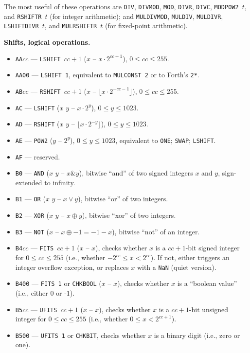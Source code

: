\documentclass[12pt,oneside]{article}
\def\makepoint#1{\medbreak\noindent{\bf #1.\ }}
\def\nxsubpoint{\refstepcounter{subsubsection}%
    \smallbreak\makepoint{\thesubsubsection}}
\def\emb#1{\textbf{#1.}}
\begin{document}
The most useful of these operations are {\tt DIV}, {\tt DIVMOD}, {\tt MOD}, {\tt DIVR}, {\tt DIVC}, {\tt MODPOW2 $t$}, and {\tt RSHIFTR $t$} (for integer arithmetic); and {\tt MULDIVMOD}, {\tt MULDIV}, {\tt MULDIVR}, {\tt LSHIFTDIVR $t$}, and {\tt MULRSHIFTR $t$} (for fixed-point arithmetic).

\nxsubpoint\emb{Shifts, logical operations}
\begin{itemize}
\item {\tt AA$cc$} --- {\tt LSHIFT $cc+1$} ($x$ -- $x\cdot2^{cc+1}$), $0\leq cc\leq255$.
\item {\tt AA00} --- {\tt LSHIFT 1}, equivalent to {\tt MULCONST 2} or to Forth's {\tt 2*}.
\item {\tt AB$cc$} --- {\tt RSHIFT $cc+1$} ($x$ -- $\lfloor x\cdot2^{-cc-1}\rfloor$), $0\leq cc\leq255$.
\item {\tt AC} --- {\tt LSHIFT} ($x$ $y$ -- $x\cdot 2^y$), $0\leq y\leq 1023$.
\item {\tt AD} --- {\tt RSHIFT} ($x$ $y$ -- $\lfloor x\cdot 2^{-y}\rfloor$), $0\leq y\leq 1023$.
\item {\tt AE} --- {\tt POW2} ($y$ -- $2^y$), $0\leq y\leq1023$, equivalent to {\tt ONE}; {\tt SWAP}; {\tt LSHIFT}.
\item {\tt AF} --- reserved.
\item {\tt B0} --- {\tt AND} ($x$ $y$ -- $x\&y$), bitwise ``and'' of two signed integers $x$ and $y$, sign-extended to infinity.
\item {\tt B1} --- {\tt OR} ($x$ $y$ -- $x\vee y$), bitwise ``or'' of two integers.
\item {\tt B2} --- {\tt XOR} ($x$ $y$ -- $x\oplus y$), bitwise ``xor'' of two integers.
\item {\tt B3} --- {\tt NOT} ($x$ -- $x\oplus-1=-1-x$), bitwise ``not'' of an integer.
\item {\tt B4$cc$} --- {\tt FITS $cc+1$} ($x$ -- $x$), checks whether $x$ is a $cc+1$-bit signed integer for $0\leq cc\leq 255$ (i.e., whether $-2^{cc}\leq x<2^{cc}$). If not, either triggers an integer overflow exception, or replaces $x$ with a {\tt NaN} (quiet version).
\item {\tt B400} --- {\tt FITS 1} or {\tt CHKBOOL} ($x$ -- $x$), checks whether $x$ is a ``boolean value'' (i.e., either 0 or -1).
\item {\tt B5$cc$} --- {\tt UFITS $cc+1$} ($x$ -- $x$), checks whether $x$ is a $cc+1$-bit unsigned integer for $0\leq cc\leq 255$ (i.e., whether $0\leq x<2^{cc+1}$).
\item {\tt B500} --- {\tt UFITS 1} or {\tt CHKBIT}, checks whether $x$ is a binary digit (i.e., zero or one).

\end{itemize}
\end{document}
